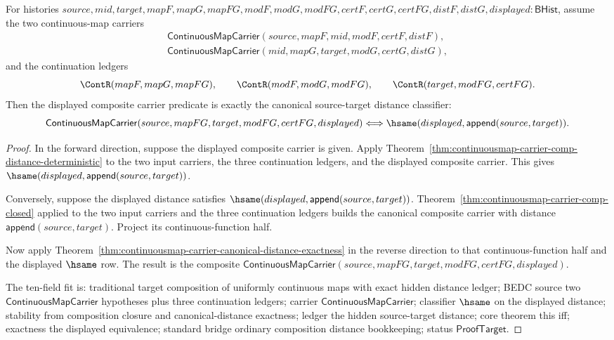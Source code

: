 \begin{theorem}
\label{thm:continuousmap-composite-canonical-distance-exactness}
For histories
$source,mid,target,mapF,mapG,mapFG,modF,modG,modFG,certF,certG,certFG,distF,distG,displayed:\mathsf{BHist}$,
assume the two continuous-map carriers
$$
\begin{array}{l}
\mathsf{ContinuousMapCarrier}(source,mapF,mid,modF,certF,distF),\\
\mathsf{ContinuousMapCarrier}(mid,mapG,target,modG,certG,distG),
\end{array}
$$
and the continuation ledgers
$$
\ContR(mapF,mapG,mapFG),\qquad
\ContR(modF,modG,modFG),\qquad
\ContR(target,modFG,certFG).
$$
Then the displayed composite carrier predicate is exactly the canonical
source-target distance classifier:
$$
\mathsf{ContinuousMapCarrier}(source,mapFG,target,modFG,certFG,displayed)
\Longleftrightarrow
\hsame(displayed,\mathsf{append}(source,target)).
$$
\end{theorem}
\begin{proof}
In the forward direction, suppose the displayed composite carrier is given.
Apply
Theorem~\ref{thm:continuousmap-carrier-comp-distance-deterministic} to the two
input carriers, the three continuation ledgers, and the displayed composite
carrier. This gives $\hsame(displayed,\mathsf{append}(source,target))$.

Conversely, suppose the displayed distance satisfies
$\hsame(displayed,\mathsf{append}(source,target))$.
Theorem~\ref{thm:continuousmap-carrier-comp-closed} applied to the two input
carriers and the three continuation ledgers builds the canonical composite
carrier with distance $\mathsf{append}(source,target)$. Project its
continuous-function half.

Now apply
Theorem~\ref{thm:continuousmap-carrier-canonical-distance-exactness} in the
reverse direction to that continuous-function half and the displayed
$\hsame$ row. The result is the composite
$\mathsf{ContinuousMapCarrier}(source,mapFG,target,modFG,certFG,displayed)$.

The ten-field fit is: traditional target composition of uniformly continuous
maps with exact hidden distance ledger; BEDC source two
$\mathsf{ContinuousMapCarrier}$ hypotheses plus three continuation ledgers;
carrier $\mathsf{ContinuousMapCarrier}$; classifier $\hsame$ on the displayed
distance; stability from composition closure and canonical-distance exactness;
ledger the hidden source-target distance; core theorem this iff; exactness the
displayed equivalence; standard bridge ordinary composition distance
bookkeeping; status $\mathsf{ProofTarget}$.
\end{proof}

